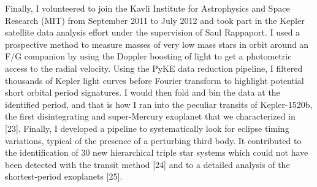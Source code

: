 \documentclass[letterpaper,12pt,onecolumn]{article}
\begin{document}
Finally, I volunteered to join the Kavli Institute for Astrophysics and Space Research (MIT) from September 2011 to July 2012 and took part in the Kepler satellite data analysis effort under the supervision of Saul Rappaport. I used a prospective method to measure masses of very low mass stars in orbit around an F/G companion by using the Doppler boosting of light to get a photometric access to the radial velocity. Using the PyKE data reduction pipeline, I filtered thousands of Kepler light curves before Fourier transform to highlight potential short orbital period signatures. I would then fold and bin the data at the identified period, and that is how I ran into the peculiar transits of Kepler-1520b, the first disintegrating and super-Mercury exoplanet that we characterized in [23]. Finally, I developed a pipeline to systematically look for eclipse timing variations, typical of the presence of a perturbing third body. It contributed to the identification of 30 new hierarchical triple star systems which could not have been detected with the transit method [24] and to a detailed analysis of the shortest-period exoplanets [25].
\end{document}
